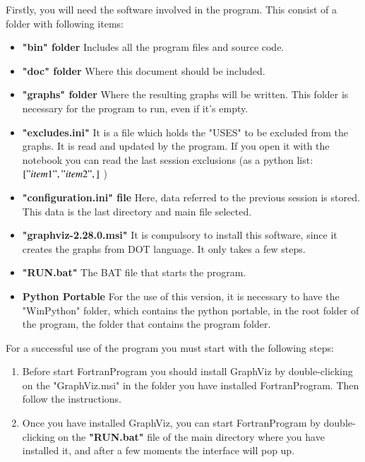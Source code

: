 Firstly, you will need the software involved in the program. This consist of a folder with following items:

\begin{itemize}
    \item \textbf{"bin" folder} Includes all the program files and source code.
    \item \textbf{"doc" folder} Where this document should be included.
    \item \textbf{"graphs" folder} Where the resulting graphs will be written. This folder is necessary for the program to run, even if it's empty.
    \item \textbf{"excludes.ini"} It is a file which holds the "USES" to be excluded from the graphs. It is read and updated by the program. If you open it with the notebook you can read the last session exclusions (as a python list: $["item1","item2",]$ )
    \item \textbf{"configuration.ini" file} Here, data referred to the previous session is stored. This data is the last directory and main file selected.
    \item \textbf{"graphviz-2.28.0.msi"} It is compulsory to install this software, since it creates the graphs from DOT language. It only takes a few steps.
    \item \textbf{"RUN.bat"} The BAT file that starts the program.%
    \item \textbf{Python Portable} For the use of this version, it is necessary to have the "WinPython" folder, which contains the python portable, in the root folder of the program, the folder that contains the program folder.
\end{itemize}

For a successful use of the program you must start with the following steps:

\begin{enumerate}
    \item 
    Before start FortranProgram you should install GraphViz by double-clicking on the "GraphViz.msi" in the folder you have installed FortranProgram. Then follow the instructions.
    \item 
    Once you have installed GraphViz, you can start FortranProgram by double-clicking on the \textbf{"RUN.bat"} file of the main directory where you have installed it, and after a few moments the interface will pop up.
    
\end{enumerate}



